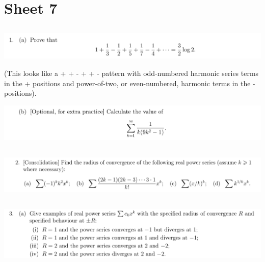 \documentclass[12pt]{article}
\begin{document}
\newpage
\section{Sheet 7}

\subsection{}
\begin{mdframed}
\includegraphics[width=400pt]{img/analysis--oxford-M2-I-7-1-a.png}
\end{mdframed}

(This looks like a + + - + + - pattern with odd-numbered harmonic series terms in the + positions
and power-of-two, or even-numbered, harmonic terms in the - positions).


\begin{mdframed}
\includegraphics[width=400pt]{img/analysis--oxford-M2-I-7-1-b.png}
\end{mdframed}

\newpage
\subsection{}
\begin{mdframed}
\includegraphics[width=400pt]{img/analysis--oxford-M2-I-7-2.png}
\end{mdframed}

\newpage
\subsection{}
\begin{mdframed}
\includegraphics[width=400pt]{img/analysis--oxford-M2-I-7-3-a.png}
\end{mdframed}
\end{document}
